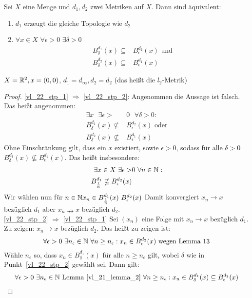 \begin{Proposition}{%
	Sei $X$ eine Menge und $d_1,d_2$ zwei Metriken auf $X$. Dann sind äquivalent:
	\begin{enumerate}
		\item \label{vl_22_stp_1} $d_1$ erzeugt die gleiche Topologie wie $d_2$
		\item \label{vl_22_stp_2} $\forall x \in X $ $ \forall \epsilon > 0 $ $\exists \delta > 0 $
		\begin{align*}
			B_\delta^{d_1}(x) \subseteq & B_\epsilon^{d_2}(x) \text{ und} \\
			B_\delta^{d_2}(x) \subseteq & B_\epsilon^{d_1}(x)
		\end{align*}
	\end{enumerate}
}\end{Proposition}

\begin{Beispiel}{
	$X = \mathbb{R}^2, x = (0,0)$,
	$d_1 = d_\infty, d_2 = d_2$ (das heißt die $l_2$-Metrik)
}\end{Beispiel}

\begin{proof}
\ref{vl_22_stp_1} $\Rightarrow$ \ref{vl_22_stp_2}: Angenommen die Aussage ist falsch. Das heißt angenommen:
\begin{align*}
	\exists x \text{ }\exists \epsilon > & 0 \text{ }\forall \delta > 0:\\
	B_\delta^{d_1}(x) \nsubseteq & B_\epsilon^{d_2}(x) \text{ oder} \\
	B_\delta^{d_2}(x) \nsubseteq & B_\epsilon^{d_1}(x)
\end{align*}
Ohne Einschränkung gilt, dass ein $x$ existiert, sowie $\epsilon >0$, sodass 
für alle $\delta > 0$ $B_\delta^{d_1}(x) \nsubseteq B_\epsilon^{d_2}(x)$. 
Das heißt insbesondere: 
\begin{align*}
	\exists x \in X \text{ } \exists \epsilon > & 0 \text{ } \forall n \in \mathbb{N}: \\
	B_{\frac{1}{n}}^{d_1} \nsubseteq B_\epsilon^{d_2}(x)
\end{align*}
Wir wählen nun für $n \in \mathbb{N} x_n \in B_{\frac{1}{n}}^{d_1}(x) \ B_\epsilon^{d_2}(x)$
Damit konvergiert $x_n \rightarrow x$ bezüglich $d_1$ aber $x_n \nrightarrow x$ 
bezüglich $d_2$.\\
\ref{vl_22_stp_2} $\Rightarrow$ \ref{vl_22_stp_1} Sei $(x_n)$ eine Folge mit 
$x_n \rightarrow x$ bezüglich $d_1$. Zu zeigen: $x_n \rightarrow x$ bezüglich $d_2$. 
Das heißt zu zeigen ist:
\begin{align*}
	\forall \epsilon > 0 \text{ } \exists n_\epsilon \in \mathbb{N} \text{ } \forall n \geq n_\epsilon: 
	x_n \in B_\epsilon^{d_2}(x) \text{ wegen Lemma 13}
\end{align*}
Wähle $n_\epsilon$ so, dass $x_n \in B_\delta^{d_1}(x)$ für alle $n \geq n_\epsilon$ 
gilt, wobei $\delta$ wie in Punkt~\ref{vl_22_stp_2} gewählt sei. Dann gilt:
\begin{align*}
	\forall \epsilon > 0 \text{ } \exists n_\epsilon \in \mathbb{N} \text{ Lemma~\ref{vl_21_lemma_2} } \forall n \geq n_\epsilon :
	x_n \in B_\delta^{d_1}(x) \subseteq B_\epsilon^{d_2}(x)
\end{align*}
\end{proof}

